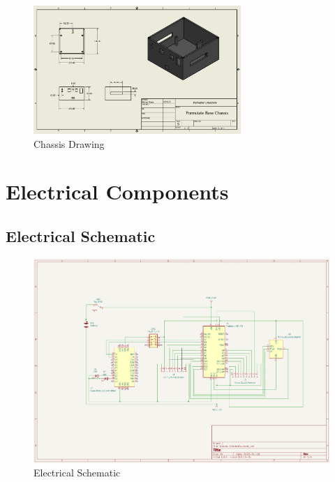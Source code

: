 \documentclass[12pt, titlepage]{article}
\begin{document}
  \begin{figure}[h!]
    \begin{center}
    \includegraphics[width=0.7\textwidth]{Chassis_Drawing.png}
    \caption{Chassis Drawing}
    \label{Fig_SystemContext} 
    \end{center}
    \end{figure}


\newpage
\section{Electrical Components}

\subsection{Electrical Schematic}
\begin{figure}[h!]
  \begin{center}
  \includegraphics[width=1.0\textwidth]{Electrical Schematic Rev2}
  \caption{Electrical Schematic}
  \end{center}
  \end{figure}
  \newpage
\end{document}
